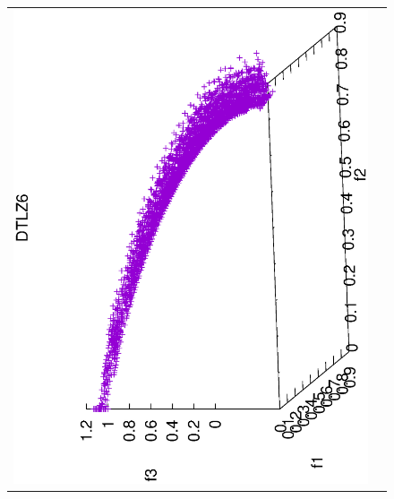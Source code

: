 \begin{figure}[H]
\begin{tabular}{cc}
 \includegraphics[scale=0.3, angle=-90,origin=c]{Figures_Chapter7/Results_Chapter4/Summary_Representative/VSD-MOEA/DTLZ6.eps} &

\end{tabular}
\end{figure}

